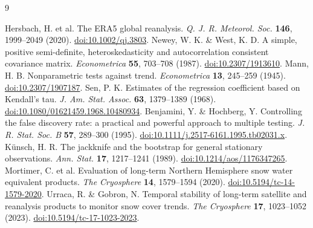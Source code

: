 \begin{thebibliography}{9}\small\raggedright
{} Hersbach, H. et al. The ERA5 global reanalysis. \emph{Q. J. R. Meteorol. Soc.} \textbf{146}, 1999--2049 (2020). \href{https://doi.org/10.1002/qj.3803}{doi:10.1002/qj.3803}.
 Newey, W. K. \& West, K. D. A simple, positive semi-definite, heteroskedasticity and autocorrelation consistent covariance matrix. \emph{Econometrica} \textbf{55}, 703--708 (1987). \href{https://doi.org/10.2307/1913610}{doi:10.2307/1913610}.
 Mann, H. B. Nonparametric tests against trend. \emph{Econometrica} \textbf{13}, 245--259 (1945). \href{https://doi.org/10.2307/1907187}{doi:10.2307/1907187}.
 Sen, P. K. Estimates of the regression coefficient based on Kendall's tau. \emph{J. Am. Stat. Assoc.} \textbf{63}, 1379--1389 (1968). \href{https://doi.org/10.1080/01621459.1968.10480934}{doi:10.1080/01621459.1968.10480934}.
 Benjamini, Y. \& Hochberg, Y. Controlling the false discovery rate: a practical and powerful approach to multiple testing. \emph{J. R. Stat. Soc. B} \textbf{57}, 289--300 (1995). \href{https://doi.org/10.1111/j.2517-6161.1995.tb02031.x}{doi:10.1111/j.2517-6161.1995.tb02031.x}.
 Künsch, H. R. The jackknife and the bootstrap for general stationary observations. \emph{Ann. Stat.} \textbf{17}, 1217--1241 (1989). \href{https://doi.org/10.1214/aos/1176347265}{doi:10.1214/aos/1176347265}.
 Mortimer, C. et al. Evaluation of long-term Northern Hemisphere snow water equivalent products. \emph{The Cryosphere} \textbf{14}, 1579--1594 (2020). \href{https://doi.org/10.5194/tc-14-1579-2020}{doi:10.5194/tc-14-1579-2020}.
 Urraca, R. \& Gobron, N. Temporal stability of long-term satellite and reanalysis products to monitor snow cover trends. \emph{The Cryosphere} \textbf{17}, 1023--1052 (2023). \href{https://doi.org/10.5194/tc-17-1023-2023}{doi:10.5194/tc-17-1023-2023}.
\end{thebibliography}
